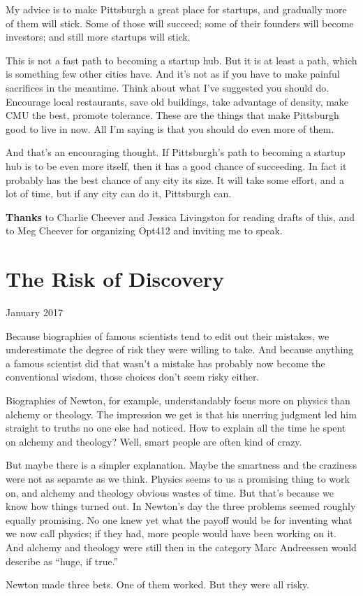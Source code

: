 \documentclass[12pt]{book}
\begin{document}
My advice is to make Pittsburgh a great place for startups, and
gradually more of them will stick. Some of those will succeed; some of
their founders will become investors; and still more startups will
stick.

This is not a fast path to becoming a startup hub. But it is at least a
path, which is something few other cities have. And it's not as if you
have to make painful sacrifices in the meantime. Think about what I've
suggested you should do. Encourage local restaurants, save old
buildings, take advantage of density, make CMU the best, promote
tolerance. These are the things that make Pittsburgh good to live in
now. All I'm saying is that you should do even more of them.

And that's an encouraging thought. If Pittsburgh's path to becoming a
startup hub is to be even more itself, then it has a good chance of
succeeding. In fact it probably has the best chance of any city its
size. It will take some effort, and a lot of time, but if any city can
do it, Pittsburgh can.

\textbf{Thanks} to Charlie Cheever and Jessica Livingston for reading
drafts of this, and to Meg Cheever for organizing Opt412 and inviting me
to speak.
\chapter{The Risk of Discovery}

January 2017

Because biographies of famous scientists tend to edit out their
mistakes, we underestimate the degree of risk they were willing to take.
And because anything a famous scientist did that wasn't a mistake has
probably now become the conventional wisdom, those choices don't seem
risky either.

Biographies of Newton, for example, understandably focus more on physics
than alchemy or theology. The impression we get is that his unerring
judgment led him straight to truths no one else had noticed. How to
explain all the time he spent on alchemy and theology? Well, smart
people are often kind of crazy.

But maybe there is a simpler explanation. Maybe the smartness and the
craziness were not as separate as we think. Physics seems to us a
promising thing to work on, and alchemy and theology obvious wastes of
time. But that's because we know how things turned out. In Newton's day
the three problems seemed roughly equally promising. No one knew yet
what the payoff would be for inventing what we now call physics; if they
had, more people would have been working on it. And alchemy and theology
were still then in the category Marc Andreessen would describe as
``huge, if true.''

Newton made three bets. One of them worked. But they were all risky.
\end{document}
